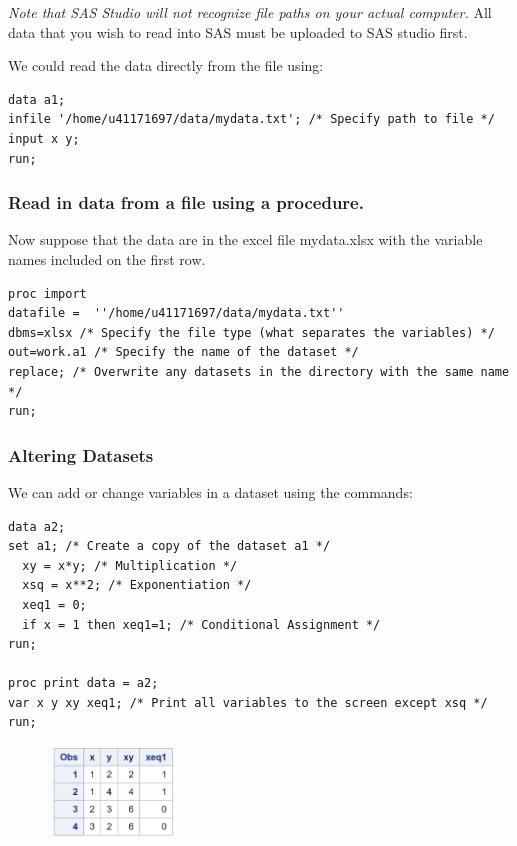 \documentclass[12pt]{notes}
\begin{document}
\nspace
\textit{Note that SAS Studio will not recognize file paths on your actual computer.} All data that you wish to read into SAS must be uploaded to SAS studio first. 

\nspace
We could read the data directly from the file using:

\begin{verbatim}
data a1; 
infile '/home/u41171697/data/mydata.txt'; /* Specify path to file */
input x y; 
run; 
\end{verbatim}

\subsubsection*{Read in data from a file using a procedure.}
Now suppose that the data are in the excel file mydata.xlsx with the variable names included on the first row. 

\begin{verbatim}
proc import
datafile =  ''/home/u41171697/data/mydata.txt'' 
dbms=xlsx /* Specify the file type (what separates the variables) */
out=work.a1 /* Specify the name of the dataset */
replace; /* Overwrite any datasets in the directory with the same name */
run; 
\end{verbatim}

\subsubsection*{Altering Datasets}
We can add or change variables in a dataset using the commands:

\begin{verbatim}
data a2; 
set a1; /* Create a copy of the dataset a1 */
  xy = x*y; /* Multiplication */
  xsq = x**2; /* Exponentiation */
  xeq1 = 0;
  if x = 1 then xeq1=1; /* Conditional Assignment */
run;

proc print data = a2; 
var x y xy xeq1; /* Print all variables to the screen except xsq */
run;
\end{verbatim}

\begin{figure}[H]
\centering
\includegraphics[width = 0.3\textwidth]{figures/module1/sas2.png}
\end{figure}
\end{document}
